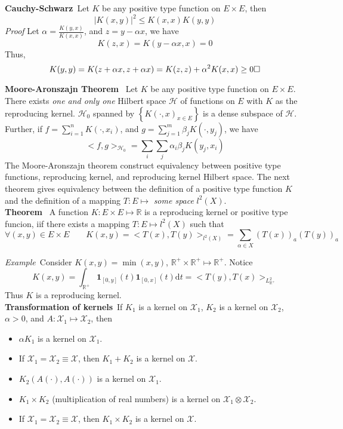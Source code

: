 \documentclass[a4paper,onecolumn]{article}
\begin{document}
\noindent \textbf{Cauchy-Schwarz}$\,$ Let $K$ be any positive type function on $E\times E$, then
$$
    \big|K(x,y)\big|^2 \le K(x,x) K(y,y)
$$
\emph{Proof} Let $\alpha=\frac{K(y,x)}{K(x,x)}$, and $z = y-\alpha x$, we have
$$
    K(z,x) = K(y-\alpha x, x) = 0
$$
Thus,
$$
    K(y,y) = K(z+\alpha x, z+\alpha x) = K(z,z) + \alpha^2 K(x,x) \ge 0    \hfill\Box
$$

\noindent \textbf{Moore-Aronszajn Theorem} $\,$ Let $K$ be any positive type function on $E\times E$.
There exists \emph{one and only one} Hilbert space $\mathcal{H}$ of functions on $E$ with $K$ as the reproducing
kernel. $\mathcal{H}_0$ spanned by $\left\{K(\cdot, x)_{x\in E}\right\}$ is a dense subspace of $\mathcal{H}$.
Further, if $f = \sum_{i=1}^n K(\cdot, x_i)$, and $g = \sum_{j=1}^m \beta_j K(\cdot, y_j)$, we have
$$
<f,g>_{\mathcal{H}_0} = \sum_{i}\sum_j \alpha_i \beta_j K(y_j, x_i)
$$
The Moore-Aronszajn theorem construct equivalency between positive type functions, reproducing kernel, and
reproducing kernel Hilbert space. The next theorem gives equivalency between the definition of a positive type
function $K$ and the definition of a mapping $T: E\mapsto $ \emph{some space} $l^2(X)$.\\

\noindent \textbf{Theorem} $\,$ A function $K: E\times E\mapsto \mathbb{R}$ is a reproducing kernel or positive type funcion, iif
there exists a mapping $T: E\mapsto l^2(X)$ such that
$$
\forall (x,y) \in E\times E \qquad K(x,y)=<T(x), T(y)>_{l^2(X)} = \sum_{\alpha\in X} \left(T(x)\right)_a \left(T(y)\right)_a
$$

\noindent \emph{Example}$\,$ Consider $K(x,y) = \min(x,y)$, $\mathbb{R}^+\times \mathbb{R}^+\mapsto \mathbb{R}^+$. Notice
$$
    K(x,y) = \int_{\mathbb{R}^+} \mathbf{1}_{[0,y]}(t) \mathbf{1}_{[0,x]}(t) \textrm{d}t = <T(y),T(x)>_{L^2_{\mathbb{R}^+}}
$$
Thus $K$ is a reproducing kernel.\\

\noindent \textbf{Transformation of kernels}$\,$ If $K_1$ is a kernel on $\mathcal{X}_1$, $K_2$ is a kernel on $\mathcal{X}_2$, $\alpha>0$,
and $A: \mathcal{X}_1\mapsto \mathcal{X}_2$, then
\begin{itemize}
    \item $\alpha K_1$ is a kernel on $\mathcal{X}_1$. 
    \item If $\mathcal{X}_1 = \mathcal{X}_2 \equiv \mathcal{X}$, then $K_1+K_2$ is a kernel on $\mathcal{X}$.
    \item $K_2(A(\cdot), A(\cdot))$ is a kernel on $\mathcal{X}_1$.
    \item $K_1\times K_2$ (multiplication of real numbers) is a kernel on $\mathcal{X}_1 \otimes \mathcal{X}_2$.
    \item If $\mathcal{X}_1 = \mathcal{X}_2 \equiv \mathcal{X}$, then $K_1\times K_2$ is a kernel on $\mathcal{X}$.
\end{itemize}
\end{document}

